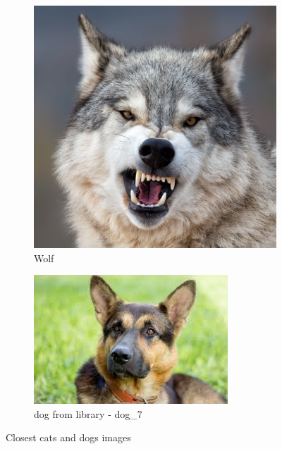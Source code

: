 \documentclass[a4paper]{iacas}
\begin{document}
\begin{figure}[!htbp]
	\begin{subfigure}{0.4\linewidth}
		\centering
		\includegraphics[width=\linewidth,scale=0.8]{imgs/wolf.jpg}
		\caption{Wolf}
	\end{subfigure}
	\begin{subfigure}{0.4\linewidth}
		\centering
		\includegraphics[width=\linewidth,scale=0.8]{imgs/dog_7.jpg}
		\caption{dog from library - dog\_7}
	\end{subfigure}


	\caption{Closest cats and dogs images}
	\label{Closest_tiger_wolf} 
\end{figure}
\vskip 0.1in




\end{document}
